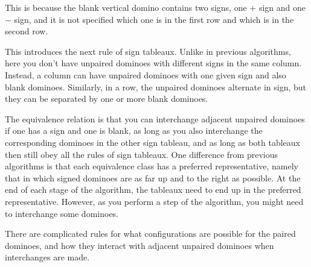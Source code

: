 \documentclass[12pt]{article}
\begin{document}
  This is because the blank vertical domino contains two signs, one $+$ sign and one $-$ sign, and it is not specified which one is in the first row and which is in the second row.

  This introduces the next rule of sign tableaux.
  Unlike in previous algorithms, here you don't have unpaired dominoes with different signs in the same column.
  Instead, a column can have unpaired dominoes with one given sign and also blank dominoes.
  Similarly, in a row, the unpaired dominoes alternate in sign, but they can be separated by one or more blank dominoes.

  The equivalence relation is that you can interchange adjacent unpaired dominoes if one has a sign and one is blank, as long as you also interchange the corresponding dominoes in the other sign tableau, and as long as both tableaux then still obey all the rules of sign tableaux.
  One difference from previous algorithms is that each equivalence class has a preferred representative, namely that in which signed dominoes are as far up and to the right as possible.
  At the end of each stage of the algorithm, the tableaux need to end up in the preferred representative.
  However, as you perform a step of the algorithm, you might need to interchange some dominoes.

  There are complicated rules for what configurations are possible for the paired dominoes, and how they interact with adjacent unpaired dominoes when interchanges are made.
\end{document}
